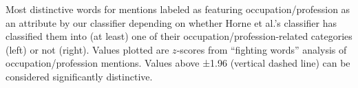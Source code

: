 Most distinctive words for mentions labeled as featuring occupation/profession as an attribute by our classifier depending on whether Horne et al.'s classifier has classified them into (at least) one of their occupation/profession-related categories (left) or not (right). Values plotted are $z$-scores from ``fighting words'' analysis of occupation/profession mentions. Values above ±1.96 (vertical dashed line) can be considered significantly distinctive.